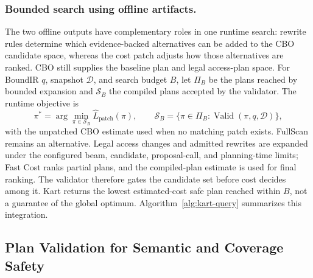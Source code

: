 \subsubsection{Bounded search using offline artifacts.}
The two offline outputs have complementary roles in one runtime search: rewrite rules determine which evidence-backed alternatives can be added to the CBO candidate space, whereas the cost patch adjusts how those alternatives are ranked. CBO still supplies the baseline plan and legal access-plan space. For BoundIR $q$, snapshot $\mathcal{D}$, and search budget $B$, let $\Pi_B$ be the plans reached by bounded expansion and $\mathcal{S}_B$ the compiled plans accepted by the validator. The runtime objective is
\begin{equation}\label{eq:method-safe-search}
 \pi^*=\arg\min_{\pi\in\mathcal{S}_B}\widehat{L}_{\mathrm{patch}}(\pi),
 \qquad \mathcal{S}_B=\{\pi\in\Pi_B:\operatorname{Valid}(\pi,q,\mathcal{D})\},
\end{equation}
with the unpatched CBO estimate used when no matching patch exists. FullScan remains an alternative. Legal access changes and admitted rewrites are expanded under the configured beam, candidate, proposal-call, and planning-time limits; Fast Cost ranks partial plans, and the compiled-plan estimate is used for final ranking. The validator therefore gates the candidate set before cost decides among it. Kart returns the lowest estimated-cost safe plan reached within $B$, not a guarantee of the global optimum. Algorithm~\ref{alg:kart-query} summarizes this integration.



\subsection{Plan Validation for Semantic and Coverage Safety}\label{sec:method-validation}

